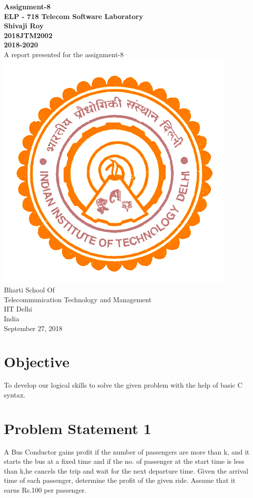 \documentclass[a4paper,12pt]{article}
\begin{document}
\begin{center}
\textbf{Assignment-8 \\
\vspace{5mm}
ELP - 718 Telecom Software Laboratory \\
\vspace{2mm}
Shivaji Roy \\
2018JTM2002 \\
2018-2020} \\
\vspace{10mm}
A report presented for the assignment-8 \\
\vspace{30mm}
\includegraphics[scale=0.5]{iitlogo} \\
\vspace{10mm}
Bharti School Of \\
Telecommunication Technology and Management \\
IIT Delhi \\
India \\
September 27, 2018

\end{center}
\newpage
\tableofcontents
\newpage
\section{Objective}
To develop our logical skills to solve the given problem with the help of basic C syntax.
\section{Problem Statement 1}
A Bus Conductor gains profit if the number of passengers are more than  k, and it starts the bus at a fixed time and  if the no. of passenger at the start time is less than k,he cancels the trip and wait for the next departure time.
Given the arrival time of each passenger, determine the profit of the given ride. Assume that it earns Rs.100 per passenger.
\end{document}
